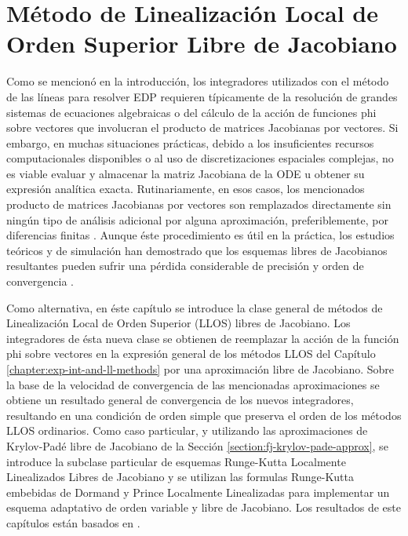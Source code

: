 \chapter{Método de Linealización Local de Orden Superior Libre de Jacobiano}\label{chapter:llrk-fj}


Como se mencionó en la introducción, los integradores utilizados con el método de las líneas para resolver EDP requieren típicamente de la resolución de grandes sistemas de ecuaciones algebraicas o del cálculo  de la acción de funciones phi sobre vectores que involucran el producto de matrices Jacobianas por vectores. Si embargo, en muchas situaciones prácticas, debido a los insuficientes recursos computacionales disponibles o al uso de discretizaciones espaciales complejas, no es viable evaluar y almacenar la matriz Jacobiana de la ODE u obtener su expresión analítica exacta. Rutinariamente, en esos casos, los mencionados producto de matrices Jacobianas por vectores son remplazados directamente sin ningún tipo de análisis adicional por alguna aproximación, preferiblemente, por diferencias finitas \cite{steihaug1979attempt,schmitt1995matrix,weiner1997rowmap,hochbruck1998exponential,hosseini1999matrix,tranquilli2014rosenbrock}. Aunque éste procedimiento es útil en la práctica, los estudios teóricos y de simulación han demostrado que los esquemas libres de Jacobianos resultantes pueden sufrir una pérdida considerable de precisión y orden de convergencia \cite{wanner1996solving,hochbruck1998exponential,tranquilli2014rosenbrock}.

Como alternativa, en éste capítulo se introduce la clase general de métodos de Linealización Local de Orden Superior (LLOS) libres de Jacobiano. Los integradores de ésta nueva clase se obtienen de reemplazar la acción de la función phi sobre vectores en la expresión general de los métodos LLOS del Capítulo \ref{chapter:exp-int-and-ll-methods} por una aproximación libre de Jacobiano. Sobre la base de la velocidad de convergencia de las mencionadas aproximaciones se obtiene un resultado general de convergencia de los nuevos integradores, resultando en una condición de orden simple que preserva el orden de los métodos LLOS ordinarios. Como caso particular, y utilizando las aproximaciones de Krylov-Padé libre de Jacobiano de la Sección \ref{section:fj-krylov-pade-approx}, se introduce la subclase particular de esquemas Runge-Kutta Localmente Linealizados Libres de Jacobiano y se utilizan las formulas Runge-Kutta embebidas de Dormand y Prince Localmente Linealizadas para implementar un esquema adaptativo de orden variable y libre de Jacobiano. Los resultados de este capítulos están basados en \cite{naranjo2022RT,naranjo2023jacobian}.

